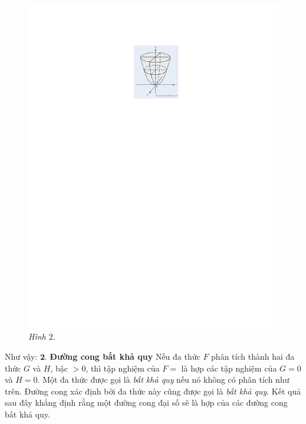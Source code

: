 \begin{multicols}{2}
\begin{center}
	\end{center}
	\begin{figure}[H]
		\vspace*{-5pt}
		\centering
		\captionsetup{labelformat= empty, justification=centering}
		\includegraphics[width= 1\linewidth]{3}
		\caption{\small\textit{\color{duongvaotoanhoc}Hình $2$.}}
		\vspace*{-10pt}
	\end{figure}
	Như vậy:
	\vskip 0.1cm
	\vskip 0.1cm
	$\pmb{2.}$ \textbf{\color{duongvaotoanhoc}Đường cong  bất khả quy}
	\vskip 0.1cm 
	Nếu đa thức $F$ phân tích thành hai đa thức $G$ và $H$, bậc $>0$, thì tập nghiệm của $F=$ là hợp các tập nghiệm của $G=0$ và $H=0$. Một đa thức được gọi là {\em bất khả quy} nếu nó không có phân tích như trên. Đường cong xác định bởi đa thức này cũng được gọi là {\em bất khả quy}. Kết quả sau đây khẳng định rằng một đường cong đại số sẽ là hợp của các đường cong bất khả quy.

\end{multicols}
